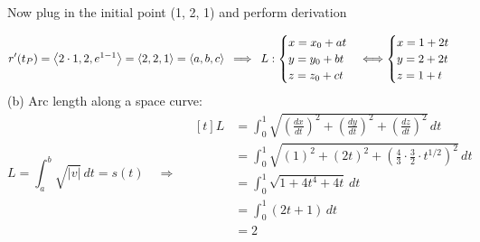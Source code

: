 \documentclass[a4paper]{exam}
\begin{document}
	\noindent Now plug in the initial point (1, 2, 1) and perform derivation
	
	$$r^{\prime}(t_{P}) = \left\langle 2 \cdot 1, 2, e^{1 - 1} \right\rangle = \left\langle 2, 2, 1 \right\rangle = \left\langle a, b, c \right\rangle 
	\hspace*{0.5em} \Longrightarrow \hspace*{0.5em} L : \begin{cases}
		x = x_{0} + at \\
		y = y_{0} + bt \\
		z = z_{0} + ct
	\end{cases} \Longleftrightarrow \begin{cases}
	x = 1 + 2t \\
	y = 2 + 2t \\
	z = 1 + t \\
	\end{cases}
	$$
	\noindent (b) Arc length along a space curve:
	\[
	L = \int_{a}^{b} \sqrt{|v|} \, dt = s(t) \quad \Longrightarrow \quad
	\begin{aligned}[t]
		L &= \int_{0}^{1} \sqrt{\left(\frac{dx}{dt}\right)^2 + \left(\frac{dy}{dt}\right)^2 + \left(\frac{dz}{dt}\right)^2} \, dt \\
		&= \int_{0}^{1} \sqrt{(1)^2 + (2t)^2 + \left( \frac{4}{3} \cdot \frac{3}{2} \cdot t^{1/2} \right)^2} \, dt \\
		&= \int_{0}^{1} \sqrt{1 + 4t^4 + 4t} \, dt \\
		&= \int_{0}^{1} (2t + 1) \, dt \\
		&= 2
	\end{aligned}
	\]
\end{document}

